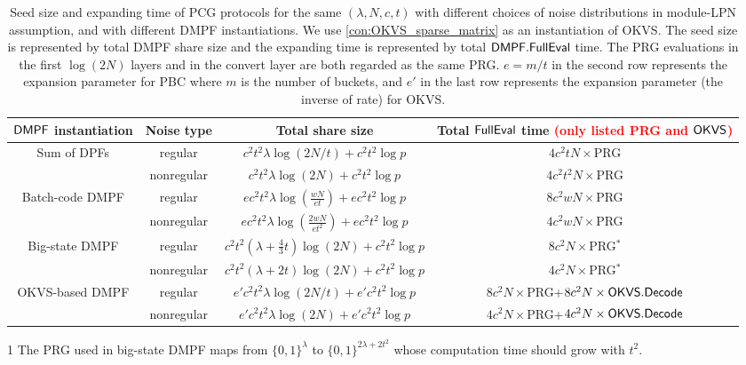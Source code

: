 \begin{table*}
    \renewcommand\arraystretch{1.5}
    \begin{threeparttable}
    \caption{Seed size and expanding time of PCG protocols for the same $(\lambda,N, c, t)$ with different choices of noise distributions in module-LPN assumption, and with different DMPF instantiations. We use \cref{con:OKVS_sparse_matrix} as an instantiation of OKVS. The seed size is represented by total DMPF share size and the expanding time is represented by total ${\sf DMPF}.{\sf FullEval}$ time. The PRG evaluations in the first $\log (2N)$ layers and in the convert layer are both regarded as the same PRG. $e = m/t$ in the second row represents the expansion parameter for PBC where $m$ is the number of buckets, and $e'$ in the last row represents the expansion parameter (the inverse of rate) for OKVS. }
	\label{tab:PCG_plug_in_formula}
		\begin{tabular}{cccc}
            \toprule
			${\sf DMPF}$ instantiation & Noise type & Total share size & Total ${\sf FullEval}$ time \textcolor{red}{(only listed PRG and ${\sf OKVS}$)} \\
            \midrule

            \multirow{2}{*}{Sum of DPFs} & regular & $c^2t^2\lambda\log(2N/t)+c^2t^2\log p$ & $4c^2tN\times$PRG \\
             & nonregular & $c^2t^2\lambda\log(2N)+c^2t^2\log p$ & $4c^2t^2N\times$PRG\\
             \cline{1-4}
            \multirow{2}{*}{Batch-code DMPF} & regular & $ec^2t^2\lambda\log(\frac{wN}{et})+ec^2t^2\log p$ & $8c^2wN\times$PRG \\
            & nonregular & $ec^2t^2\lambda\log(\frac{2wN}{et^2})+ec^2t^2\log p$ & $4c^2wN\times$PRG\\
            \cline{1-4}

            \multirow{2}{*}{Big-state DMPF} & regular & $c^2t^2(\lambda+\frac{4}{3}t)\log (2N)+c^2t^2\log p$ & $8c^2N\times$PRG$^*$\tnote{1} \\
            & nonregular & $c^2t^2(\lambda+2t)\log (2N)+c^2t^2\log p$ & $4c^2N\times$PRG$^*$ \\
            \cline{1-4}

            \multirow{2}{*}{OKVS-based DMPF} & regular & $e'c^2t^2\lambda\log(2N/t)+e'c^2t^2\log p$ & $8c^2N\times$PRG+$8c^2N\times{\sf OKVS}.{\sf Decode}$  \\
            & nonregular & $e'c^2t^2\lambda\log(2N)+e'c^2t^2\log p$ & $4c^2N\times$PRG+$4c^2N\times{\sf OKVS}.{\sf Decode}$\\
            \bottomrule
		\end{tabular}
    \begin{tablenotes}
      \item [1] The PRG used in big-state DMPF maps from $\{0,1\}^\lambda$ to $\{0,1\}^{2\lambda+2t^2}$ whose computation time should grow with $t^2$. 
    \end{tablenotes}
  \end{threeparttable}
\end{table*}

